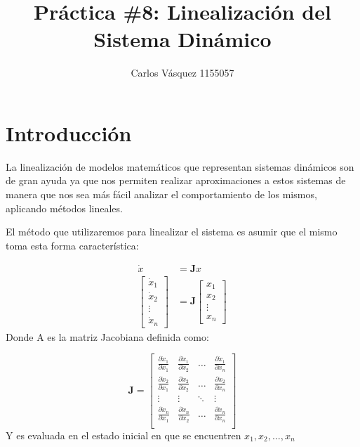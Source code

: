 \documentclass[12pt, letterpaper]{article}
\title{Práctica \#8: Linealización del Sistema Dinámico}
\author{Carlos Vásquez 1155057}
\begin{document}
\maketitle

\section*{Introducción}

La linealización de modelos matemáticos que representan sistemas dinámicos son de gran ayuda ya que nos permiten realizar aproximaciones a estos sistemas de manera que nos sea más fácil analizar el comportamiento de los mismos, aplicando métodos lineales.

El método que utilizaremos para linealizar el sistema es asumir que el mismo toma esta forma característica:

\begin{equation}
	\begin{split}
		\dot x &= \textbf{J}x\\
		\begin{bmatrix} 
			\dot x_{1} \\
			\dot x_2 \\
			\vdots \\
			\dot x_n
		\end{bmatrix} &=
		\textbf{J} \begin{bmatrix}
			x_1 \\
			x_2 \\
			\vdots \\
			x_n
		\end{bmatrix}
	\end{split}
\end{equation}
Donde A es la matriz Jacobiana definida como:

\begin{equation}
	\textbf{J} =
	\begin{bmatrix}
		\frac{\partial{\dot x_1}}{\partial{x_1}} & \frac{\partial{\dot x_1}}{\partial{x_2}} & \dots & \frac{\partial{\dot x_1}}{\partial{x_n}} \\

		\frac{\partial{\dot x_2}}{\partial{x_1}} & \frac{\partial{\dot x_2}}{\partial{x_2}} & \dots & \frac{\partial{\dot x_2}}{\partial{x_n}} \\

		\vdots & \vdots & \ddots & \vdots \\

		\frac{\partial{\dot x_n}}{\partial{x_1}} & \frac{\partial{\dot x_n}}{\partial{x_2}} & \dots & \frac{\partial{\dot x_n}}{\partial{x_n}} \\
	\end{bmatrix}
\end{equation}
Y es evaluada en el estado inicial en que se encuentren $x_1, x_2, \dots, x_n$
\end{document}
